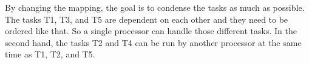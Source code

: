 By changing the mapping, the goal is to condense the tasks as much as possible. 
The tasks T1, T3, and T5 are dependent on each other and they need to be ordered like that. So a single processor can handle those different tasks. 
In the second hand, the tasks T2 and T4 can be run by another processor at the same time as T1, T2, and T5.
